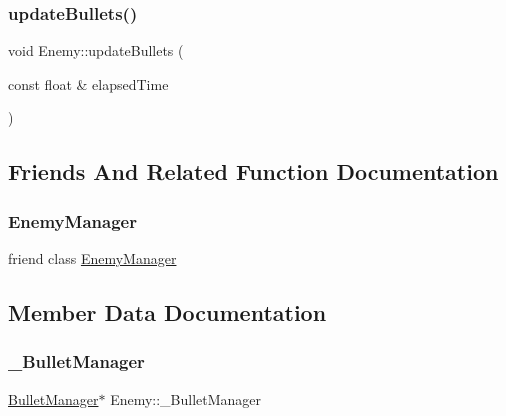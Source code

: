 \subsubsection{\texorpdfstring{update\+Bullets()}{updateBullets()}}
{\footnotesize\ttfamily void Enemy\+::update\+Bullets (\begin{DoxyParamCaption}\item[{const float \&}]{elapsed\+Time }\end{DoxyParamCaption})\hspace{0.3cm}{\ttfamily [private]}}



\subsection{Friends And Related Function Documentation}
\mbox{\label{class_enemy_a316703164b8c295e193f235a3c275003}} 
\subsubsection{\texorpdfstring{Enemy\+Manager}{EnemyManager}}
{\footnotesize\ttfamily friend class \hyperlink{class_enemy_manager}{Enemy\+Manager}\hspace{0.3cm}{\ttfamily [friend]}}



\subsection{Member Data Documentation}
\mbox{\label{class_enemy_a5f5dbc651e786307c64b99b6a4219f99}} 
\subsubsection{\texorpdfstring{\+\_\+\+Bullet\+Manager}{\_BulletManager}}
{\footnotesize\ttfamily \hyperlink{class_bullet_manager}{Bullet\+Manager}$\ast$ Enemy\+::\+\_\+\+Bullet\+Manager\hspace{0.3cm}{\ttfamily [private]}}

\mbox{\label{class_enemy_aefebf6e5fb323b9b27510c26707d0013}} 
